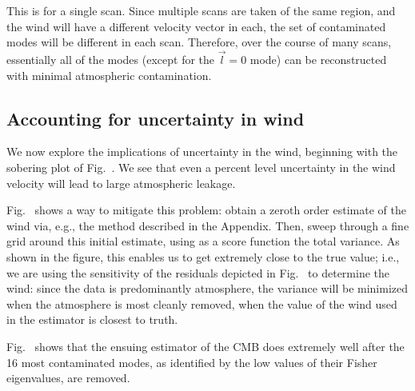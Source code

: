 
This is for a single scan. Since multiple scans are taken of the same region, and the wind will have a different velocity vector in each, the set of contaminated modes will be different in each scan. Therefore, over the course of many scans, essentially all of the modes (except for the $\vec l=0$ mode) can be reconstructed with minimal atmospheric contamination.

\subsection{Accounting for uncertainty in wind}


We now explore the implications of uncertainty in the wind, beginning with the sobering plot of Fig.~. We see that even a percent level uncertainty in the wind velocity will lead to large atmospheric leakage. 


Fig.~ shows a way to mitigate this problem: obtain a zeroth order estimate of the wind via, e.g., the method described in the Appendix. Then, sweep through a fine grid around this initial estimate, using as a score function the total variance. As shown in the figure, this enables us to get extremely close to the true value; i.e., we are using the sensitivity of the residuals depicted in Fig.~ to determine the wind: since the data is predominantly atmosphere, the variance will be minimized when the atmosphere is most cleanly removed, when the value of the wind used in the estimator is closest to truth.


Fig.~ shows that the ensuing estimator of the CMB does extremely well after the 16 most contaminated modes, as identified by the low values of their Fisher eigenvalues, are removed.


